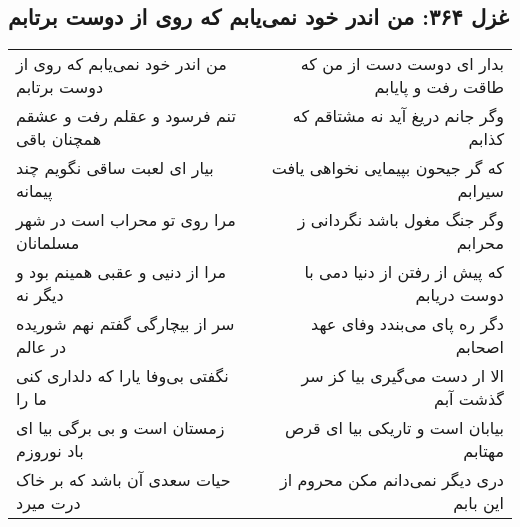 \begin{center}
\section*{غزل ۳۶۴: من اندر خود نمی‌یابم که روی از دوست برتابم}
\label{sec:364}
\begin{longtable}{l p{0.5cm} r}
من اندر خود نمی‌یابم که روی از دوست برتابم
&&
بدار ای دوست دست از من که طاقت رفت و پایابم
\\
تنم فرسود و عقلم رفت و عشقم همچنان باقی
&&
وگر جانم دریغ آید نه مشتاقم که کذابم
\\
بیار ای لعبت ساقی نگویم چند پیمانه
&&
که گر جیحون بپیمایی نخواهی یافت سیرابم
\\
مرا روی تو محراب است در شهر مسلمانان
&&
وگر جنگ مغول باشد نگردانی ز محرابم
\\
مرا از دنیی و عقبی همینم بود و دیگر نه
&&
که پیش از رفتن از دنیا دمی با دوست دریابم
\\
سر از بیچارگی گفتم نهم شوریده در عالم
&&
دگر ره پای می‌بندد وفای عهد اصحابم
\\
نگفتی بی‌وفا یارا که دلداری کنی ما را
&&
الا ار دست می‌گیری بیا کز سر گذشت آبم
\\
زمستان است و بی برگی بیا ای باد نوروزم
&&
بیابان است و تاریکی بیا ای قرص مهتابم
\\
حیات سعدی آن باشد که بر خاک درت میرد
&&
دری دیگر نمی‌دانم مکن محروم از این بابم
\\
\end{longtable}
\end{center}
